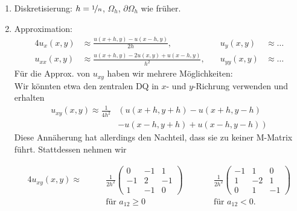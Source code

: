 \documentclass{cheat-sheet}
\begin{document}
\begin{verf}
  \begin{enumerate}
    \item Diskretisierung: $h = \nicefrac{1}{n}$, $\Omega_h$, $\partial \Omega_h$ wie früher.
    \item Approximation:
    \begin{alignat*}{4}
      u_x(x, y) & \approx \tfrac{u(x + h, y) - u(x - h, y)}{2h}, \quad
      & u_y(x, y) & \approx \ldots \\
      u_{xx}(x, y) & \approx \tfrac{u(x + h, y) - 2 u(x, y) + u(x - h, y)}{h^2}, \quad
      & u_{yy}(x, y) & \approx \ldots
    \end{alignat*}
    Für die Approx. von $u_{xy}$ haben wir mehrere Möglichkeiten: \\ Wir könnten etwa den zentralen DQ in $x$- und $y$-Richrung verwenden und erhalten
    \begin{align*}
      u_{xy}(x, y) \approx \tfrac{1}{4 h^2} & \left( u(x{+}h, y{+}h) - u(x{+}h, y{-}h) \right. \\
      & \left. - u(x{-}h, y{+}h) + u(x{-}h, y{-}h) \right)
    \end{align*}
    Diese Annäherung hat allerdings den Nachteil, dass sie zu keiner M-Matrix führt.
    Stattdessen nehmen wir
    \iffalse
    \begin{align*}
      u_{xy}(x, y) & \approx \tfrac{1}{2 h^2} (- u(x-h, y) + 2 u(x,y) - u(x+h,y) \\
      & + u(x-h,y-h) - u(x, y+h) - u(x,y-h) \\
      & + u(x+h, y+h) ) \qquad \text{falls $a_{12}(x, y) \geq 0$,} \\
      u_{xy}(x, y) & \approx \tfrac{1}{2 h^2} ( u(x-h, y) - 2 u(x, y) + u(x+h, y) \\
      & + u(x, y+h) - u(x-h, y+h) - u(x+h, y-h) \\
      & + u(x,y-h) ) \qquad \text{falls $a_{12}(x, y) < 0$}
    \end{align*}
    \fi
    \begin{alignat*}{4}
      u_{xy}(x, y) \approx \qquad
      & \tfrac{1}{2 h^2} \begin{pmatrix}
        0 & -1 & 1 \\
        -1 & 2 & -1 \\
        1 & -1 & 0
      \end{pmatrix} \qquad
      && \tfrac{1}{2 h^2} \begin{pmatrix}
        -1 & 1 & 0 \\
        1 & -2 & 1 \\
        0 & 1 & -1
      \end{pmatrix} \\
      & \text{für } a_{12} \geq 0
      && \text{für } a_{12} < 0.
    \end{alignat*}


\end{enumerate}
\end{verf}
\end{document}
